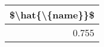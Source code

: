 \begin{tabular}{r}
\toprule
 \$\textbackslash hat\{\textbackslash \{name\}\}\$ \\
\midrule
           0.755 \\
\bottomrule
\end{tabular}
